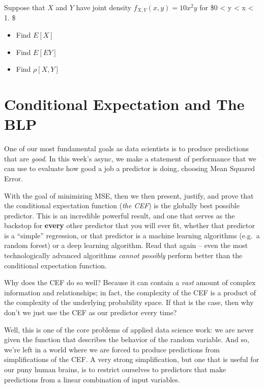\documentclass[
]{book}
\providecommand{\tightlist}{%
  \setlength{\itemsep}{0pt}\setlength{\parskip}{0pt}}
\theoremstyle{definition}
\theoremstyle{definition}
\theoremstyle{definition}
\theoremstyle{definition}
\theoremstyle{remark}
\begin{document}
Suppose that \(X\) and \(Y\) have joint density \(f_{X,Y}(x,y) = 10 x^2y\) for \$0 \textless{} y \textless{} x \textless{} 1. \$

\begin{itemize}
\tightlist
\item
  Find \(E[X]\)
\item
  Find \(E[EY]\)
\item
  Find \(\rho[X,Y]\)
\end{itemize}

\hypertarget{conditional-expectation-and-the-blp}{%
\chapter{Conditional Expectation and The BLP}\label{conditional-expectation-and-the-blp}}

One of our most fundamental goals as data scientists is to produce predictions that are \emph{good}. In this week's async, we make a statement of performance that we can use to evaluate how good a job a predictor is doing, choosing Mean Squared Error.

With the goal of minimizing MSE, then we then present, justify, and prove that the conditional expectation function (\emph{the CEF}) is the globally best possible predictor. This is an incredible powerful result, and one that serves as the backstop for \textbf{every} other predictor that you will ever fit, whether that predictor is a ``simple'' regression, or that predictor is a machine learning algorithms (e.g.~a random forest) or a deep learning algorithm. Read that again -- even the most technologically advanced algorithms \emph{cannot possibly} perform better than the conditional expectation function.

Why does the CEF do so well? Because it can contain a \emph{vast} amount of complex information and relationships; in fact, the complexity of the CEF is a product of the complexity of the underlying probability space. If that is the case, then why don't we just use the CEF as our predictor every time?

Well, this is one of the core problems of applied data science work: we are never given the function that describes the behavior of the random variable. And so, we're left in a world where we are forced to produce predictions from simplifications of the CEF. A very strong simplification, but one that is useful for our puny human brains, is to restrict ourselves to predictors that make predictions from a linear combination of input variables.
\end{document}
